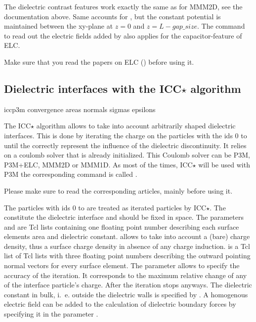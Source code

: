 The dielectric contrast features work exactly the same as for MMM2D,
see the documentation above. Same accounts for  
, but the constant potential is maintained between the xy-plane
at $z=0$ and $z=L-gap\_size$. The command  to read  
out the electric fields added by   also applies 
for the capacitor-feature of ELC.

Make sure that you read the papers on ELC (\cite{elc,icelc})
before using it.

\subsection{Dielectric interfaces with the ICC$\star$ algorithm}

\begin{essyntax}
  iccp3m  
  convergence 
  areas 
  normals 
  sigmas 
  epsilons 
  \begin{features}
  \end{features}
\end{essyntax}

The ICC$\star$ algorithm allows to take into account arbitrarily
shaped dielectric interfaces.  This is done by iterating the charge on
the particles with the ids 0 to  until
the correctly represent the influence of the dielectric
discontinuity. It relies on a coulomb solver that is already
initialized. This Coulomb solver can be P3M, P3M+ELC, MMM2D or MMM1D.
As most of the times, ICC$\star$ will be used with P3M the
corresponding command is called .

Please make sure to read the corresponding articles,
mainly\cite{espresso2, tyagi10a, kesselheim11a} before using it.

The particles with ids 0 to  are treated
as iterated particles by ICC$\star$.  The constitute the dielectric
interface and should be fixed in space. The parameters  and
 are Tcl lists containing one floating point number
describing each surface elements area and dielectric
constant.  allows to take into account a (bare) charge
density, thus a surface charge density in absence of any charge
induction.  is a Tcl list of Tcl lists with three
floating point numbers describing the outward pointing normal vectors
for every surface element.  The parameter 
allows to specify the accuracy of the iteration. It corresponds to the
maximum relative change of any of the interface particle's
charge. After  the iteration stops anyways. The
dielectric constant in bulk, i.~e. outside the dielectric walls is
specified by . A homogenous electric field can be added
to the calculation of dielectric boundary forces by specifying it in
the parameter .

